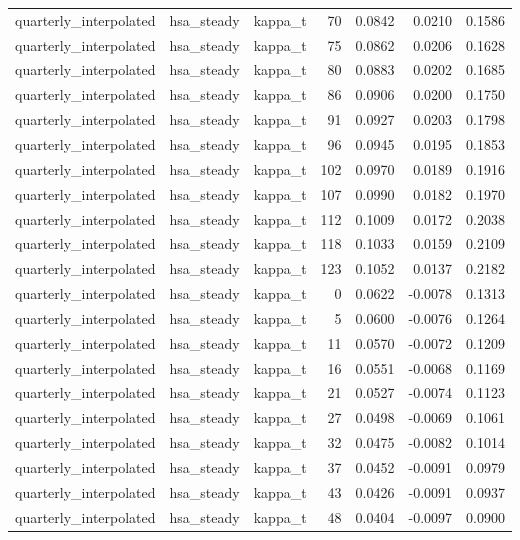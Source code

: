\begin{tabular}{lllrrrr}
quarterly\_interpolated & hsa\_steady & kappa\_t & 70 & 0.0842 & 0.0210 & 0.1586 \\
quarterly\_interpolated & hsa\_steady & kappa\_t & 75 & 0.0862 & 0.0206 & 0.1628 \\
quarterly\_interpolated & hsa\_steady & kappa\_t & 80 & 0.0883 & 0.0202 & 0.1685 \\
quarterly\_interpolated & hsa\_steady & kappa\_t & 86 & 0.0906 & 0.0200 & 0.1750 \\
quarterly\_interpolated & hsa\_steady & kappa\_t & 91 & 0.0927 & 0.0203 & 0.1798 \\
quarterly\_interpolated & hsa\_steady & kappa\_t & 96 & 0.0945 & 0.0195 & 0.1853 \\
quarterly\_interpolated & hsa\_steady & kappa\_t & 102 & 0.0970 & 0.0189 & 0.1916 \\
quarterly\_interpolated & hsa\_steady & kappa\_t & 107 & 0.0990 & 0.0182 & 0.1970 \\
quarterly\_interpolated & hsa\_steady & kappa\_t & 112 & 0.1009 & 0.0172 & 0.2038 \\
quarterly\_interpolated & hsa\_steady & kappa\_t & 118 & 0.1033 & 0.0159 & 0.2109 \\
quarterly\_interpolated & hsa\_steady & kappa\_t & 123 & 0.1052 & 0.0137 & 0.2182 \\
quarterly\_interpolated & hsa\_steady & kappa\_t & 0 & 0.0622 & -0.0078 & 0.1313 \\
quarterly\_interpolated & hsa\_steady & kappa\_t & 5 & 0.0600 & -0.0076 & 0.1264 \\
quarterly\_interpolated & hsa\_steady & kappa\_t & 11 & 0.0570 & -0.0072 & 0.1209 \\
quarterly\_interpolated & hsa\_steady & kappa\_t & 16 & 0.0551 & -0.0068 & 0.1169 \\
quarterly\_interpolated & hsa\_steady & kappa\_t & 21 & 0.0527 & -0.0074 & 0.1123 \\
quarterly\_interpolated & hsa\_steady & kappa\_t & 27 & 0.0498 & -0.0069 & 0.1061 \\
quarterly\_interpolated & hsa\_steady & kappa\_t & 32 & 0.0475 & -0.0082 & 0.1014 \\
quarterly\_interpolated & hsa\_steady & kappa\_t & 37 & 0.0452 & -0.0091 & 0.0979 \\
quarterly\_interpolated & hsa\_steady & kappa\_t & 43 & 0.0426 & -0.0091 & 0.0937 \\
quarterly\_interpolated & hsa\_steady & kappa\_t & 48 & 0.0404 & -0.0097 & 0.0900 \\

\end{tabular}
